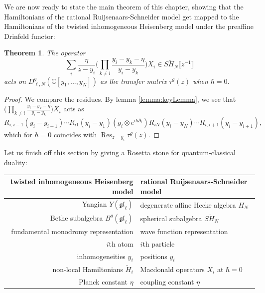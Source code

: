 \documentclass[11pt]{report}
\newtheorem{theorem}{Theorem}[section]
\theoremstyle{definition}
\theoremstyle{remark}
\theoremstyle{remark}
\newcommand{\C}{\mathbb{C}}
\newcommand{\I}{\mathrm{i}}
\begin{document}
We are now ready to state the main theorem of this chapter, showing that the Hamiltonians of the rational Ruijsenaars-Schneider model get mapped to the Hamiltonians of the twisted inhomogeneous Heisenberg model under the preaffine Drinfeld functor:

\begin{theorem}
The operator
\begin{equation*}
\sum_i \frac{\eta}{z-y_i} \bigg( \prod_{k \neq i} \frac{y_i-y_k-\eta}{y_i-y_k} \bigg) X_i \in S\ddot H_N\llbracket z^{-1} \rrbracket
\end{equation*}
acts on $D_{\ell,N}^g(\C[y_1,...,y_N])$ as the transfer matrix $\tau^g(z)$ when $\hbar = 0$.
\end{theorem}

\begin{proof}
We compare the residues. By lemma \ref{lemma:keyLemma}, we see that $\bigg( \prod_{k \neq i} \frac{y_i-y_k-\eta}{y_i-y_k} \bigg) X_i$ acts as
\begin{equation*}
R_{i,i-1}(y_i-y_{i-1}) \cdots R_{i1}(y_i-y_1) (g_i \otimes e^{\I \hbar \partial_i}) R_{iN}(y_i-y_N) \cdots R_{i,i+1}(y_i-y_{i+1}),
\end{equation*}
which for $\hbar = 0$ coincides with $\operatorname{Res}_{z=y_i} \tau^g(z)$.
\end{proof}

Let us finish off this section by giving a Rosetta stone for quantum-classical duality:
\begin{center}
\begin{tabular}{|r||l|}
\hline
twisted inhomogeneous Heisenberg model & rational Ruijsenaars-Schneider model \\
\hline
Yangian $Y(\mathfrak{gl}_\ell)$ & degenerate affine Hecke algebra $\dot H_N$ \\
Bethe subalgebra $B^g(\mathfrak{gl}_\ell)$ & spherical subalgebra $S\ddot H_N$ \\
fundamental monodromy representation & wave function representation \\
$i$th atom & $i$th particle \\
inhomogeneities $y_i$ & positions $y_i$ \\
non-local Hamiltonians $\check H_i$ & Macdonald operators $X_i$ at $\hbar = 0$ \\
Planck constant $\eta$ & coupling constant $\eta$ \\
\hline
\end{tabular}
\end{center}
\end{document}
